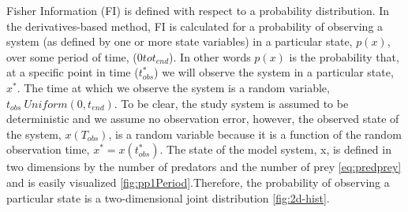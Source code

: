 \documentclass[12pt,twoside,openany]{reedthesis}
\begin{document}
Fisher Information (FI) is defined with respect to a probability distribution. In the derivatives-based method, FI is calculated for a probability of observing a system (as defined by one or more state variables) in a particular state, \(p(x)\), over some period of time, (\(0 to t_{end}\)). In other words \(p(x)\) is the probability that, at a specific point in time (\(t_{obs}^*\)) we will observe the system in a particular state, \(x^*\). The time at which we observe the system is a random variable, \(t_{obs} ~ Uniform(0,t_{end})\). To be clear, the study system is assumed to be deterministic and we assume no observation error, however, the observed state of the system, \(x(T_{obs})\), is a random variable because it is a function of the random observation time, \(x^*= x(t_{obs}^*)\). The state of the model system, x, is defined in two dimensions by the number of predators and the number of prey \eqref{eq:predprey} and is easily visualized \ref{fig:pp1Period}.Therefore, the probability of observing a particular state is a two-dimensional joint distribution \ref{fig:2d-hist}.
\end{document}
